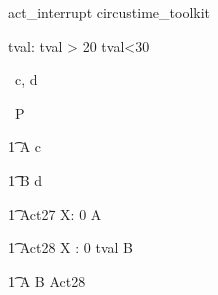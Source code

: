 \begin{zsection}
   \SECTION act\_interrupt \parents circustime\_toolkit
\end{zsection}


\begin{axdef}
   tval: \nat
\where
   tval > 20 \land tval<30
\end{axdef}


\begin{circus}
   \circchannel\ c, d \\
\end{circus}

\begin{circus}
    \circprocess\ P \circdef \circbegin \\
\end{circus}


\begin{circusaction}
    	\t1 A \circdef c \then \Skip \\
\end{circusaction}

\begin{circusaction}
        \t1 B \circdef d \then \Skip \\
\end{circusaction}


\begin{circusaction}
    	\t1 Act27 \circdef    \lcirctime X: 0  \rcirctime \circstartby A \\
\end{circusaction}

\begin{circusaction}
    	\t1 Act28 \circdef   \lcirctime X : 0 \upto tval \rcirctime \circstartby B \\
\end{circusaction}


\begin{circusaction}        
        \t1 \circspot A \circseq B \extchoice Act28\\
\end{circusaction}

\begin{circus}    
\circend
\end{circus}

